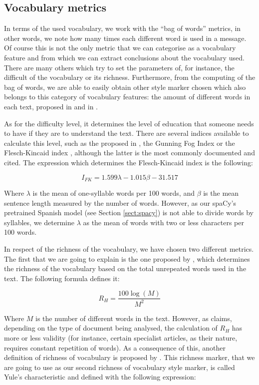\subsection{Vocabulary metrics}\label{ssect:vocabf}

In terms of the used vocabulary, we work with the ``bag of words'' metrics, in other words, we note how many times each different word is used in a message. Of course this is not the only metric that we can categorise as a vocabulary feature and from which we can extract conclusions about the vocabulary used. There are many others which try to set the parameters of, for instance, the difficult of the vocabulary or its richness. Furthermore, from the computing of the bag of words, we are able to easily obtain other style marker chosen which also belongs to this category of vocabulary features: the amount of different words in each text, proposed in \cite{ril2014determination} and in \cite{corney2001identifying}.

As for the difficulty level, it determines the level of education that someone needs to have if they are to understand the text. There are several indices available to calculate this level, such as the proposed in \cite{dale1948formula}, the Gunning Fog Index \citep{wiki:gunning} or the Flesch-Kincaid index \citep{dubay2004principles}, although the latter is the most commonly documented and cited. The expression which determines the Flesch-Kincaid index is the following:

$$
I_{FK} = 1.599\lambda-1.015\beta-31.517
$$

Where $\lambda$ is the mean of one-syllable words per 100 words, and $\beta$ is the mean sentence length measured by the number of words. However, as our spaCy's pretrained Spanish model (see Section \ref{sect:spacy}) is not able to divide words by syllables, we determine $\lambda$ as the mean of words with two or less characters per 100 words.

In respect of the richness of the vocabulary, we have chosen two different metrics. The first that we are going to explain is the one proposed by \cite{honore1979some}, which determines the richness of the vocabulary based on the total unrepeated words used in the text. The following formula defines it:

$$
R_H = \frac{100\log(M)}{M^2}
$$

Where $M$ is the number of different words in the text. However, as \cite{ril2014determination} claims, depending on the type of document being analysed, the calculation of $R_H$ has more or less validity (for instance, certain specialist articles, as their nature, requires constant repetition of words). As a consequence of this, another definition of richness of vocabulary is proposed by \cite{yule2014statistical}. This richness marker, that we are going to use as our second richness of vocabulary style marker, is called Yule's characteristic and defined with the following expression:

